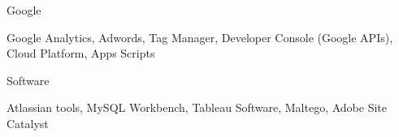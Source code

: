 \begin{cventries}
	\zcventry
	{Google} %
	{
		\begin{cvitems} %
			\item {Google Analytics, Adwords, Tag Manager, Developer Console (Google APIs), Cloud Platform, Apps Scripts}
		\end{cvitems}
	}
	
	\zcventry
	{Software} %
	{
		\begin{cvitems} %
			\item {Atlassian tools, MySQL Workbench, Tableau Software, Maltego, Adobe Site Catalyst}
		\end{cvitems}
	}	
	
\end{cventries}

